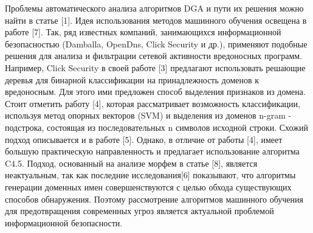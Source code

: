 Проблемы автоматического анализа алгоритмов DGA и пути их решения можно найти в статье [1]. Идея использования методов машинного обучения освещена в работе [7]. Так, ряд известных компаний, занимающихся информационной безопасностью (Damballa, OpenDns, Click Security и др.), применяют подобные решения для анализа и фильтрации сетевой активности вредоносных программ.
Например, Click Security в своей работе [3] предлагают использовать решающие деревья для бинарной классификации на принадлежность доменов к вредоносным. Для этого ими предложен способ выделения признаков из домена.
Стоит отметить работу [4], которая рассматривает возможность классификации, используя метод опорных векторов (SVM) и выделения из доменов n-gram - подстрока, состоящая из последовательных n символов исходной строки. Схожий подход описывается и в работе [5]. Однако, в отличие от работы [4], имеет большую практическую направленность и предлагает использование алгоритма C4.5.
Подход, основанный на анализе морфем в статье [8], является неактуальным, так как последние исследования[6] показывают, что алгоритмы генерации доменных имен совершенствуются с целью обхода существующих способов обнаружения. Поэтому рассмотрение алгоритмов машинного обучения для предотвращения современных угроз является актуальной проблемой информационной безопасности.

\clearpage